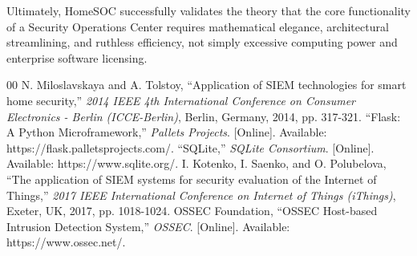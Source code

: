 \documentclass[conference]{IEEEtran}
\begin{document}
Ultimately, HomeSOC successfully validates the theory that the core functionality of a Security Operations Center requires mathematical elegance, architectural streamlining, and ruthless efficiency, not simply excessive computing power and enterprise software licensing.

\begin{thebibliography}{00}
 N. Miloslavskaya and A. Tolstoy, ``Application of SIEM technologies for smart home security,'' \textit{2014 IEEE 4th International Conference on Consumer Electronics - Berlin (ICCE-Berlin)}, Berlin, Germany, 2014, pp. 317-321.
 ``Flask: A Python Microframework,'' \textit{Pallets Projects}. [Online]. Available: https://flask.palletsprojects.com/.
 ``SQLite,'' \textit{SQLite Consortium}. [Online]. Available: https://www.sqlite.org/.
 I. Kotenko, I. Saenko, and O. Polubelova, ``The application of SIEM systems for security evaluation of the Internet of Things,'' \textit{2017 IEEE International Conference on Internet of Things (iThings)}, Exeter, UK, 2017, pp. 1018-1024.
 OSSEC Foundation, ``OSSEC Host-based Intrusion Detection System,'' \textit{OSSEC}. [Online]. Available: https://www.ossec.net/.
\end{thebibliography}
\end{document}
